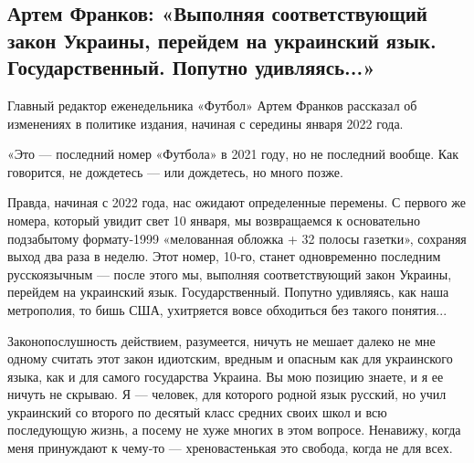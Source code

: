  
 
 
 
 
\subsection{Артем Франков: «Выполняя соответствующий закон Украины, перейдем на украинский язык. Государственный. Попутно удивляясь...»}
\label{sec:24_12_2021.stz.sport.ua.dynamokiev.1.mova}


\begin{zznagolos}
Главный редактор еженедельника «Футбол» Артем Франков рассказал об изменениях в
политике издания, начиная с середины января 2022 года.
\end{zznagolos}

«Это — последний номер «Футбола» в 2021 году, но не последний вообще. Как
говорится, не дождетесь — или дождетесь, но много позже.


Правда, начиная с 2022 года, нас ожидают определенные перемены. С первого же
номера, который увидит свет 10 января, мы возвращаемся к основательно
подзабытому формату‑1999 «мелованная обложка + 32 полосы газетки», сохраняя
выход два раза в неделю. Этот номер, 10‑го, станет одновременно последним
русскоязычным — после этого мы, выполняя соответствующий закон Украины,
перейдем на украинский язык. Государственный. Попутно удивляясь, как наша
метрополия, то бишь США, ухитряется вовсе обходиться без такого понятия...

Законопослушность действием, разумеется, ничуть не мешает далеко не мне одному
считать этот закон идиотским, вредным и опасным как для украинского языка, как
и для самого государства Украина. Вы мою позицию знаете, и я ее ничуть не
скрываю. Я — человек, для которого родной язык русский, но учил украинский со
второго по десятый класс средних своих школ и всю последующую жизнь, а посему
не хуже многих в этом вопросе. Ненавижу, когда меня принуждают к чему‑то —
хреновастенькая это свобода, когда не для всех.

